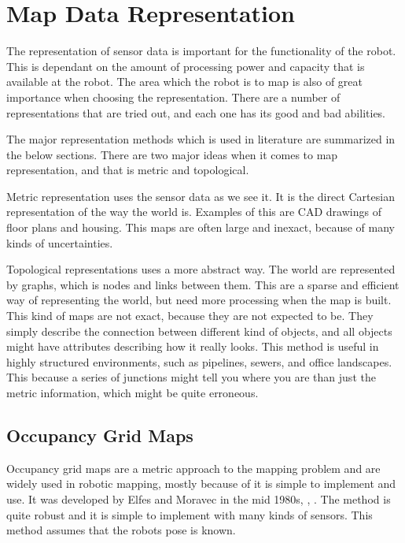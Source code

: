 \section{Map Data Representation}
\label{chap2:sec-representations}
The representation of sensor data is important for the functionality of the robot. This is
dependant on the amount of processing power and capacity that is available at the robot.
The area which the robot is to map is also of great importance when choosing the
representation. There are a number of representations that are tried out, and each one has its good and
bad abilities. 

The major representation methods which is used in literature are summarized in the below
sections. There are two major ideas when it comes to map representation, and that is
metric and topological.

Metric representation uses the sensor data as we see it. It is the direct Cartesian
representation of the way the world is. Examples of this are CAD drawings of floor plans
and housing. This maps are often large and inexact, because of many kinds of
uncertainties.

Topological representations uses a more abstract way. The world are represented by graphs,
which is nodes and links between them. This are a sparse and efficient way of representing
the world, but need more processing when the map is built. This kind of maps are not
exact, because they are not expected to be. They simply describe the connection between
different kind of objects, and all objects might have attributes describing how it really
looks. This method is useful in highly structured environments, such as pipelines, sewers,
and office landscapes. This because a series of junctions might tell you where you are
than just the metric information, which might be quite erroneous. 


\subsection{Occupancy Grid Maps}
Occupancy grid maps are a metric approach to the mapping problem and are widely used in 
robotic mapping, mostly because of it is simple to implement and use. It was developed 
by Elfes and Moravec in the mid 1980s, \cite{elfes}, \cite{moravec}. The method is quite 
robust and it is simple to implement with many kinds of sensors. This method assumes that 
the robots pose is known.

